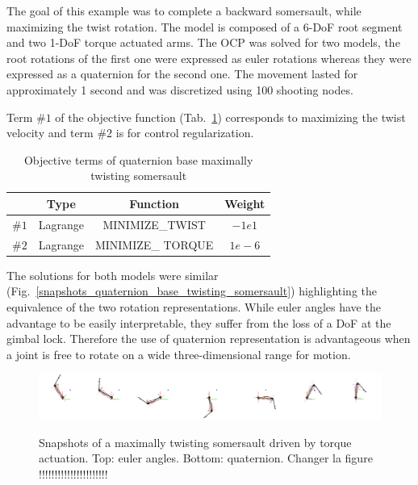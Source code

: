 The goal of this example was to complete a backward somersault, while maximizing the twist rotation.
The model is composed of a 6-DoF root segment and two 1-DoF torque actuated arms.
The OCP was solved for two models, the root rotations of the first one were expressed as euler rotations whereas they were expressed as a quaternion for the second one.
The movement lasted for approximately 1 second and was discretized using 100 shooting nodes.

Term $\#1$ of the objective function (Tab.~\ref{tab:Quaternion_base_twisting_somersault}) corresponds to maximizing the twist velocity and term $\#2$ is for control regularization.


\begin{table}[h!]
\caption{\small Objective terms of quaternion base maximally twisting somersault}
\label{tab:Quaternion_base_twisting_somersault}
\centering
\begin{tabular}{c c c c}
\toprule 
& Type & Function & Weight \\ 
\midrule
$\#1$ & Lagrange & MINIMIZE\_TWIST & $-1e1$ \\ 
\midrule
$\#2$ & Lagrange & MINIMIZE\_ TORQUE & $1e-6$ \\ 
\bottomrule
\end{tabular}
\end{table}


The solutions for both models were similar (Fig.~\ref{snapshots_quaternion_base_twisting_somersault}) highlighting the equivalence of the two rotation representations.
While euler angles have the advantage to be easily interpretable, they suffer from the loss of a DoF at the gimbal lock.
Therefore the use of quaternion representation is advantageous when a joint is free to rotate on a wide three-dimensional range for motion.


\begin{figure}[t!]
\centering
\includegraphics[width=\textwidth]{figures/activation_pointing_snapshots_acados.png}\\
\caption{Snapshots of a maximally twisting somersault driven by torque actuation. Top: euler angles. Bottom: quaternion. Changer la figure !!!!!!!!!!!!!!!!!!!!!!}
\label{fig:snapshots_quaternion_base_twisting_somersault}
\end{figure}












